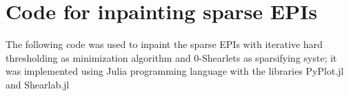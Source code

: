 \chapter{Code for inpainting sparse EPIs}
\label{sec:Appendix_C}

The following code was used to inpaint the sparse EPIs with iterative hard thresholding as minimization algorithm and $0$-Shearlets as sparsifying syste; it was implemented using Julia programming language with the libraries PyPlot.jl and Shearlab.jl



